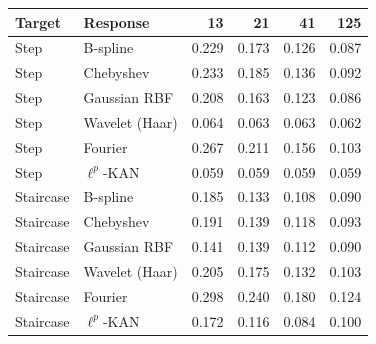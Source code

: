 \begin{tabular}{llrrrr}
\toprule
Target & Response & 13 & 21 & 41 & 125 \\
\midrule
Step & B-spline & 0.229 & 0.173 & 0.126 & 0.087 \\
Step & Chebyshev & 0.233 & 0.185 & 0.136 & 0.092 \\
Step & Gaussian RBF & 0.208 & 0.163 & 0.123 & 0.086 \\
Step & Wavelet (Haar) & 0.064 & 0.063 & 0.063 & 0.062 \\
Step & Fourier & 0.267 & 0.211 & 0.156 & 0.103 \\
Step & $\ell^p$-KAN & 0.059 & 0.059 & 0.059 & 0.059 \\
\midrule
Staircase & B-spline & 0.185 & 0.133 & 0.108 & 0.090 \\
Staircase & Chebyshev & 0.191 & 0.139 & 0.118 & 0.093 \\
Staircase & Gaussian RBF & 0.141 & 0.139 & 0.112 & 0.090 \\
Staircase & Wavelet (Haar) & 0.205 & 0.175 & 0.132 & 0.103 \\
Staircase & Fourier & 0.298 & 0.240 & 0.180 & 0.124 \\
Staircase & $\ell^p$-KAN & 0.172 & 0.116 & 0.084 & 0.100 \\
\bottomrule\end{tabular}
